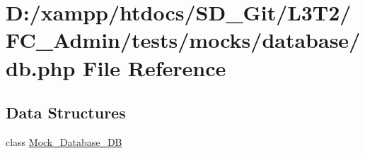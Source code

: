 \hypertarget{tests_2mocks_2database_2_d_b_8php}{}\section{D\+:/xampp/htdocs/\+S\+D\+\_\+\+Git/\+L3\+T2/\+F\+C\+\_\+\+Admin/tests/mocks/database/db.php File Reference}
\label{tests_2mocks_2database_2_d_b_8php}
\subsection*{Data Structures}
\begin{DoxyCompactItemize}
\item 
class \hyperlink{class_mock___database___d_b}{Mock\+\_\+\+Database\+\_\+\+D\+B}
\end{DoxyCompactItemize}
